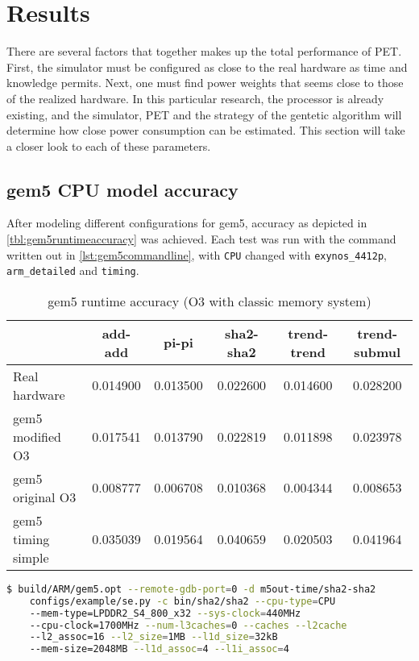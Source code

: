 \section{Results}



There are several factors that together makes up the total performance of PET. First, the simulator must be
configured as close to the real hardware as time and knowledge permits. Next, one must find power weights that
seems close to those of the realized hardware. In this particular research, the processor is already existing,
and the simulator, PET and the strategy of the gentetic algorithm will determine how close power consumption
can be estimated. This section will take a closer look to each of these parameters.

\subsection{gem5 CPU model accuracy}

After modeling different configurations for gem5, accuracy as depicted in \autoref{tbl:gem5runtimeaccuracy}
was achieved. Each test was run with the command written out in \autoref{lst:gem5commandline}, with \texttt{CPU}
changed with  \texttt{exynos\_4412p}, \texttt{arm\_detailed} and \texttt{timing}.

\begin{table}
\centering
\begin{tabular}{|l|c|c|c|c|c|}
\hline
   & add-add & pi-pi & sha2-sha2 & trend-trend & trend-submul\\
\hline
Real hardware & 0.014900  & 0.013500 & 0.022600 & 0.014600 & 0.028200\\
gem5 modified O3    & 0.017541 & 0.013790 & 0.022819 & 0.011898 & 0.023978 \\
gem5 original O3    & 0.008777 & 0.006708 & 0.010368 & 0.004344 & 0.008653\\
gem5 timing simple  & 0.035039 & 0.019564 & 0.040659 & 0.020503 & 0.041964 \\
\hline
\end{tabular}
\caption{gem5 runtime accuracy (O3 with classic memory system)}
\label{tbl:gem5runtimeaccuracy}
\end{table}

\begin{lstlisting}[float=htb,language=sh,numbers=none,label={lst:gem5commandline},caption={gem5 Command Line}]
$ build/ARM/gem5.opt --remote-gdb-port=0 -d m5out-time/sha2-sha2
    configs/example/se.py -c bin/sha2/sha2 --cpu-type=CPU
    --mem-type=LPDDR2_S4_800_x32 --sys-clock=440MHz
    --cpu-clock=1700MHz --num-l3caches=0 --caches --l2cache
    --l2_assoc=16 --l2_size=1MB --l1d_size=32kB
    --mem-size=2048MB --l1d_assoc=4 --l1i_assoc=4
\end{lstlisting}

